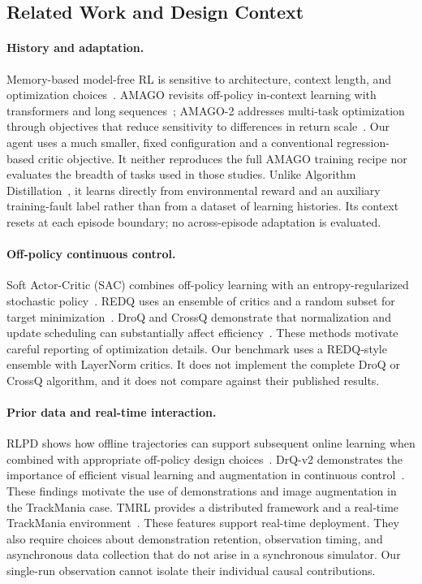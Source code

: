 \documentclass[runningheads]{llncs}
\begin{document}
\subsection{Related Work and Design Context}
\paragraph{History and adaptation.}
Memory-based model-free RL is sensitive to architecture, context length, and optimization choices~\cite{ni}. AMAGO revisits off-policy in-context learning with transformers and long sequences~\cite{amago}; AMAGO-2 addresses multi-task optimization through objectives that reduce sensitivity to differences in return scale~\cite{amago2}. Our agent uses a much smaller, fixed configuration and a conventional regression-based critic objective. It neither reproduces the full AMAGO training recipe nor evaluates the breadth of tasks used in those studies. Unlike Algorithm Distillation~\cite{ad}, it learns directly from environmental reward and an auxiliary training-fault label rather than from a dataset of learning histories. Its context resets at each episode boundary; no across-episode adaptation is evaluated.

\paragraph{Off-policy continuous control.}
Soft Actor-Critic (SAC) combines off-policy learning with an entropy-regularized stochastic policy~\cite{sac}. REDQ uses an ensemble of critics and a random subset for target minimization~\cite{redq}. DroQ and CrossQ demonstrate that normalization and update scheduling can substantially affect efficiency~\cite{droq,crossq}. These methods motivate careful reporting of optimization details. Our benchmark uses a REDQ-style ensemble with LayerNorm critics. It does not implement the complete DroQ or CrossQ algorithm, and it does not compare against their published results.

\paragraph{Prior data and real-time interaction.}
RLPD shows how offline trajectories can support subsequent online learning when combined with appropriate off-policy design choices~\cite{rlpd}. DrQ-v2 demonstrates the importance of efficient visual learning and augmentation in continuous control~\cite{drqv2}. These findings motivate the use of demonstrations and image augmentation in the TrackMania case. TMRL provides a distributed framework and a real-time TrackMania environment~\cite{tmrl}. These features support real-time deployment. They also require choices about demonstration retention, observation timing, and asynchronous data collection that do not arise in a synchronous simulator. Our single-run observation cannot isolate their individual causal contributions.
\end{document}
